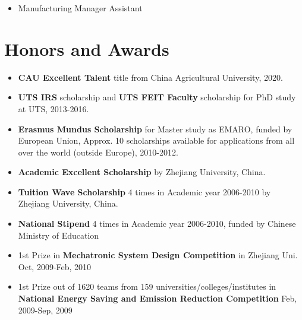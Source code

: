 \documentclass[margin,line]{res}
\begin{document}
\begin{resume}
\begin{itemize}
\vspace*{-2.5mm}
\item[] Manufacturing Manager Assistant
\end{itemize}

\section{\sc Honors and Awards} 
\begin{itemize}

\item {\bf CAU Excellent Talent} title from China Agricultural University, 2020.

\vspace*{-2.5mm}
\item {\bf UTS IRS} %
scholarship and {\bf UTS FEIT Faculty} scholarship for PhD study at UTS, 2013-2016.

\vspace*{-2.5mm}
\item {\bf Erasmus Mundus Scholarship} for Master study as EMARO, funded by European Union, Approx. 10 scholarships available for applications from all over the world (outside Europe), 2010-2012.

\vspace*{-2.5mm}
\item {\bf Academic Excellent Scholarship} by Zhejiang University, China.

\vspace*{-2.5mm}
\item {\bf Tuition Wave Scholarship} 4 times in Academic year 2006-2010 by Zhejiang University, China.

\vspace*{-2.5mm}
\item {\bf National Stipend} 4 times in Academic year 2006-2010, funded by Chinese Ministry of Education

\vspace*{-2.5mm}
\item 1st Prize in {\bf Mechatronic System Design Competition} in Zhejiang Uni. Oct, 2009-Feb, 2010

\vspace*{-2.5mm}
\item 1st Prize out of 1620 teams from 159 universities/colleges/institutes in {\bf National Energy Saving and Emission Reduction Competition} Feb, 2009-Sep, 2009


\end{itemize}


\end{resume}
\end{document}
